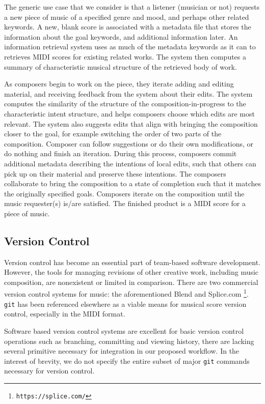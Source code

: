 \documentclass[final,authoryear,5p,times,twocolumn]{elsarticle}
\begin{document}
The generic use case that we consider is that a listener (musician or not) requests a new piece of music of a specified genre and mood, and perhaps other related keywords. A new, blank score is associated with a metadata file that stores the information about the goal keywords, and additional information later. An information retrieval system uses as much of the metadata keywords as it can to retrieves MIDI scores for existing related works. The system then computes a summary of characteristic musical structure of the retrieved body of work.

As composers begin to work on the piece, they iterate adding and editing material, and receiving feedback from the system about their edits. The system computes the similarity of the structure of the composition-in-progress to the characteristic intent structure, and helps composers choose which edits are most relevant. The system also suggests edits that align with bringing the composition closer to the goal, for example switching the order of two parts of the composition. Composer can follow suggestions or do their own modifications, or do nothing and finish an iteration. During this process, composers commit additional metadata describing the intentions of local edits, such that others can pick up on their material and preserve these intentions. The composers collaborate to bring the composition to a state of completion such that it matches the originally specified goals. Composers iterate on the composition until the music requester(s) is/are satisfied. The finished product is a MIDI score for a piece of music.
 


\subsection{Version Control}

Version control has become an essential part of team-based software development. However, the tools for managing
revisions of other creative work, including music composition, are nonexistent or limited in comparison. There are
two commercial version control systems for music: the aforementioned Blend and Splice.com \footnote{\texttt{https://splice.com/}}. \texttt{git} \citep{torvalds2010git} has been referenced elsewhere \citep{oberholtzer2015computational} as a viable means for musical score version control, especially in the MIDI format.

Software based version control systems are excellent for basic version control operations such as branching, committing and viewing history, there are lacking several primitive necessary for integration in our proposed workflow. In the interest of brevity, we do not specify the entire subset of major \texttt{git} commands necessary for version control.
\end{document}
